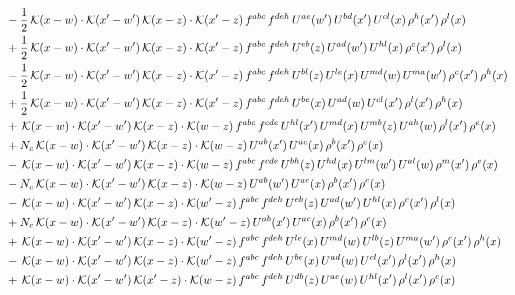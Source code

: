 \documentclass[9pt]{article}
\numberwithin{equation}{section}
\begin{document}
\begin{align}
& -\frac{1}{2}\,\mathcal{K}(x-w)\cdot\mathcal{K}(x'-w')\,\mathcal{K}(x-z)\cdot\mathcal{K}(x'-z)\,f^{abc}\,f^{deh}\,U^{ae}(w')\,U^{bd}(x')\,U^{cl}(x)\,\rho^{h}(x')\,\rho^{l}(x)\notag\\
& +\frac{1}{2}\,\mathcal{K}(x-w)\cdot\mathcal{K}(x'-w')\,\mathcal{K}(x-z)\cdot\mathcal{K}(x'-z)\,f^{abc}\,f^{deh}\,U^{eb}(z)\,U^{ad}(w')\,U^{hl}(x)\,\rho^{c}(x')\,\rho^{l}(x)\notag\\
& -\frac{1}{2}\,\mathcal{K}(x-w)\cdot\mathcal{K}(x'-w')\,\mathcal{K}(x-z)\cdot\mathcal{K}(x'-z)\,f^{abc}\,f^{deh}\,U^{bl}(z)\,U^{le}(x)\,U^{md}(w)\,U^{ma}(w')\,\rho^{c}(x')\,\rho^{h}(x)\notag\\
& +\frac{1}{2}\,\mathcal{K}(x-w)\cdot\mathcal{K}(x'-w')\,\mathcal{K}(x-z)\cdot\mathcal{K}(x'-z)\,f^{abc}\,f^{deh}\,U^{be}(x)\,U^{ad}(w)\,U^{cl}(x')\,\rho^{l}(x')\,\rho^{h}(x)\notag\\
& +\,\mathcal{K}(x-w)\cdot\mathcal{K}(x'-w')\,\mathcal{K}(x-z)\cdot\mathcal{K}(w-z)\,f^{abc}\,f^{cde}\,U^{hl}(x')\,U^{md}(x)\,U^{mb}(z)\,U^{ah}(w)\,\rho^{l}(x')\,\rho^{e}(x)\notag\\
& +N_{c}\,\mathcal{K}(x-w)\cdot\mathcal{K}(x'-w')\,\mathcal{K}(x-z)\cdot\mathcal{K}(w-z)\,U^{ab}(x')\,U^{ac}(x)\,\rho^{b}(x')\,\rho^{c}(x)\notag\\
& -\,\mathcal{K}(x-w)\cdot\mathcal{K}(x'-w')\,\mathcal{K}(x-z)\cdot\mathcal{K}(w-z)\,f^{abc}\,f^{cde}\,U^{bh}(z)\,U^{hd}(x)\,U^{lm}(w')\,U^{al}(w)\,\rho^{m}(x')\,\rho^{e}(x)\notag\\
& -N_{c}\,\mathcal{K}(x-w)\cdot\mathcal{K}(x'-w')\,\mathcal{K}(x-z)\cdot\mathcal{K}(w-z)\,U^{ab}(w')\,U^{ac}(x)\,\rho^{b}(x')\,\rho^{c}(x)\notag\\
& -\,\mathcal{K}(x-w)\cdot\mathcal{K}(x'-w')\,\mathcal{K}(x-z)\cdot\mathcal{K}(w'-z)\,f^{abc}\,f^{deh}\,U^{eb}(z)\,U^{ad}(w')\,U^{hl}(x)\,\rho^{c}(x')\,\rho^{l}(x)\notag\\
& +N_{c}\,\mathcal{K}(x-w)\cdot\mathcal{K}(x'-w')\,\mathcal{K}(x-z)\cdot\mathcal{K}(w'-z)\,U^{ab}(x')\,U^{ac}(x)\,\rho^{b}(x')\,\rho^{c}(x)\notag\\
& +\,\mathcal{K}(x-w)\cdot\mathcal{K}(x'-w')\,\mathcal{K}(x-z)\cdot\mathcal{K}(w'-z)\,f^{abc}\,f^{deh}\,U^{le}(x)\,U^{md}(w)\,U^{lb}(z)\,U^{ma}(w')\,\rho^{c}(x')\,\rho^{h}(x)\notag\\
& -\,\mathcal{K}(x-w)\cdot\mathcal{K}(x'-w')\,\mathcal{K}(x-z)\cdot\mathcal{K}(w'-z)\,f^{abc}\,f^{deh}\,U^{be}(x)\,U^{ad}(w)\,U^{cl}(x')\,\rho^{l}(x')\,\rho^{h}(x)\notag\\
& +\,\mathcal{K}(x-w)\cdot\mathcal{K}(x'-w')\,\mathcal{K}(x'-z)\cdot\mathcal{K}(w-z)\,f^{abc}\,f^{deh}\,U^{db}(z)\,U^{ae}(w)\,U^{hl}(x')\,\rho^{l}(x')\,\rho^{c}(x)\notag\\

\end{align}
\end{document}
